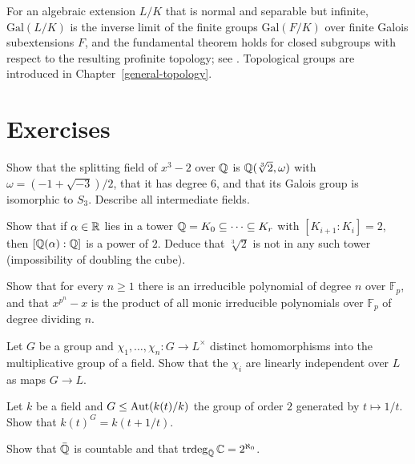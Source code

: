 \begin{remark}\label{fields:remark-infinite-galois}
For an algebraic extension $L/K$ that is normal and separable but infinite, $\mathrm{Gal}(L/K)$ is
the inverse limit of the finite groups $\mathrm{Gal}(F/K)$ over finite Galois subextensions $F$, and the
fundamental theorem holds for closed subgroups with respect to the resulting profinite
topology; see \cite[Chapter VI, \S 14]{lang-algebra}. Topological groups are introduced in
Chapter~\ref{general-topology}.
\end{remark}

\section{Exercises}\label{fields:section-exercises}

\begin{exercise}\label{fields:exercise-splitting-x3-2}
Show that the splitting field of $x^3 - 2$ over $\mathbb{Q}$ is $\mathbb{Q}(\sqrt[3]{2}, \omega)$ with
$\omega = (-1 + \sqrt{-3})/2$, that it has degree $6$, and that its Galois group is isomorphic to
$S_3$. Describe all intermediate fields.
\end{exercise}

\begin{exercise}\label{fields:exercise-constructible}
Show that if $\alpha \in \mathbb{R}$ lies in a tower $\mathbb{Q} = K_0 \subseteq \cdots \subseteq K_r$ with $[K_{i+1} : K_i] = 2$, then
$[\mathbb{Q}(\alpha) : \mathbb{Q}]$ is a power of $2$. Deduce that $\sqrt[3]{2}$ is not in any such tower
(impossibility of doubling the cube).
\end{exercise}

\begin{exercise}\label{fields:exercise-irreducible-finite-field}
Show that for every $n \geq 1$ there is an irreducible polynomial of degree $n$ over $\mathbb{F}_p$, and
that $x^{p^n} - x$ is the product of all monic irreducible polynomials over $\mathbb{F}_p$ of degree
dividing $n$.
\end{exercise}

\begin{exercise}\label{fields:exercise-dedekind-independence}
Let $G$ be a group and $\chi_1, \ldots, \chi_n \colon G \to L^\times$ distinct homomorphisms into the
multiplicative group of a field. Show that the $\chi_i$ are linearly independent over $L$ as maps
$G \to L$.
\end{exercise}

\begin{exercise}\label{fields:exercise-rational-function-field}
Let $k$ be a field and $G \leq \operatorname{Aut}(k(t)/k)$ the group of order $2$ generated by $t \mapsto 1/t$.
Show that $k(t)^G = k(t + 1/t)$.
\end{exercise}

\begin{exercise}\label{fields:exercise-ahlfors-countable-algebraic}
Show that $\bar{\mathbb{Q}}$ is countable and that $\operatorname{trdeg}_{\bar{\mathbb{Q}}} \mathbb{C} = 2^{\aleph_0}$.
\end{exercise}
